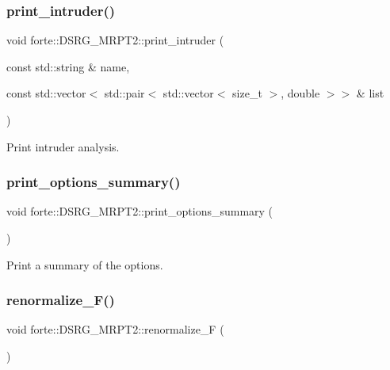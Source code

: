 \subsubsection{\texorpdfstring{print\+\_\+intruder()}{print\_intruder()}}
{\footnotesize\ttfamily void forte\+::\+D\+S\+R\+G\+\_\+\+M\+R\+P\+T2\+::print\+\_\+intruder (\begin{DoxyParamCaption}\item[{const std\+::string \&}]{name,  }\item[{const std\+::vector$<$ std\+::pair$<$ std\+::vector$<$ size\+\_\+t $>$, double $>$$>$ \&}]{list }\end{DoxyParamCaption})\hspace{0.3cm}{\ttfamily [protected]}}



Print intruder analysis. 

\mbox{\label{classforte_1_1_d_s_r_g___m_r_p_t2_aa9aa3365f09c4a576a61bfb21c18e046}} 
\subsubsection{\texorpdfstring{print\+\_\+options\+\_\+summary()}{print\_options\_summary()}}
{\footnotesize\ttfamily void forte\+::\+D\+S\+R\+G\+\_\+\+M\+R\+P\+T2\+::print\+\_\+options\+\_\+summary (\begin{DoxyParamCaption}{ }\end{DoxyParamCaption})\hspace{0.3cm}{\ttfamily [protected]}}



Print a summary of the options. 

\mbox{\label{classforte_1_1_d_s_r_g___m_r_p_t2_ae7d4e5e977b7a7a199d0fa6dc68cbb6b}} 
\subsubsection{\texorpdfstring{renormalize\+\_\+\+F()}{renormalize\_F()}}
{\footnotesize\ttfamily void forte\+::\+D\+S\+R\+G\+\_\+\+M\+R\+P\+T2\+::renormalize\+\_\+F (\begin{DoxyParamCaption}{ }\end{DoxyParamCaption})\hspace{0.3cm}{\ttfamily [protected]}}



